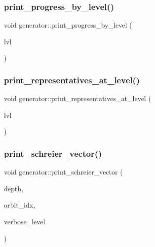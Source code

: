 \mbox{\label{classgenerator_a7440be7583571676c0cce394aae53fef}} 
\subsubsection{\texorpdfstring{print\+\_\+progress\+\_\+by\+\_\+level()}{print\_progress\_by\_level()}}
{\footnotesize\ttfamily void generator\+::print\+\_\+progress\+\_\+by\+\_\+level (\begin{DoxyParamCaption}\item[{\mbox{\hyperlink{galois_8h_a09fddde158a3a20bd2dcadb609de11dc}{I\+NT}}}]{lvl }\end{DoxyParamCaption})}

\mbox{\label{classgenerator_ad9d7823a4d09ba2a401a9ac2e4884f53}} 
\subsubsection{\texorpdfstring{print\+\_\+representatives\+\_\+at\+\_\+level()}{print\_representatives\_at\_level()}}
{\footnotesize\ttfamily void generator\+::print\+\_\+representatives\+\_\+at\+\_\+level (\begin{DoxyParamCaption}\item[{\mbox{\hyperlink{galois_8h_a09fddde158a3a20bd2dcadb609de11dc}{I\+NT}}}]{lvl }\end{DoxyParamCaption})}

\mbox{\label{classgenerator_aa31c8a1d5c8f5ccb054a07455983b0d1}} 
\subsubsection{\texorpdfstring{print\+\_\+schreier\+\_\+vector()}{print\_schreier\_vector()}}
{\footnotesize\ttfamily void generator\+::print\+\_\+schreier\+\_\+vector (\begin{DoxyParamCaption}\item[{\mbox{\hyperlink{galois_8h_a09fddde158a3a20bd2dcadb609de11dc}{I\+NT}}}]{depth,  }\item[{\mbox{\hyperlink{galois_8h_a09fddde158a3a20bd2dcadb609de11dc}{I\+NT}}}]{orbit\+\_\+idx,  }\item[{\mbox{\hyperlink{galois_8h_a09fddde158a3a20bd2dcadb609de11dc}{I\+NT}}}]{verbose\+\_\+level }\end{DoxyParamCaption})}

